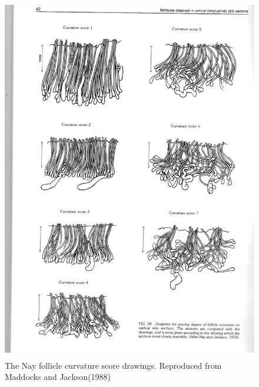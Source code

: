 %

\begin{figure}[!h]
  \centering
  \includegraphics[width=1.0\textwidth]{follcurv.png}
  \caption{The Nay follicle curvature score drawings.  Reproduced from Maddocks and Jackson(1988)~\cite{madd:88}}
  \label{fig:follcurv}
\end{figure}

%

